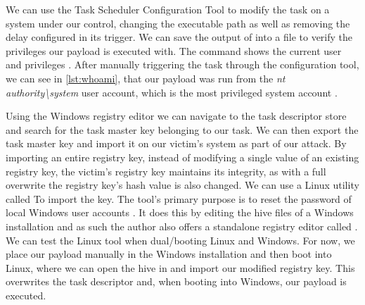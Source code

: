 We can use the Task Scheduler Configuration Tool to modify the  task on a system under our control, changing the executable path as well as removing the delay configured in its trigger.
We can save the output of  into a file to verify the privileges our payload is executed with.
The  command shows the current user and privileges \cite{microsoft-whoami}.
After manually triggering the task through the configuration tool, we can see in \autoref{lst:whoami}, that our payload was run from the \emph{nt authority\textbackslash system} user account, which is the most privileged system account \cite{microsoft-localsystem-account}.

\vspace{1em}



Using the Windows registry editor  we can navigate to the task descriptor store and search for the task master key belonging to our task.
We can then export the task master key and import it on our victim's system as part of our attack.
By importing an entire registry key, instead of modifying a single value of an existing registry key, the victim's registry key maintains its integrity, as with a full overwrite the registry key's hash value is also changed.
We can use a Linux utility called  To import the key.
The tool's primary purpose is to reset the password of local Windows user accounts \cite{chntpw}.
It does this by editing the hive files of a Windows installation and as such the author also offers a standalone registry editor called .
We can test the Linux tool when dual\-/booting Linux and Windows.
For now, we place our payload manually in the Windows installation and then boot into Linux, where we can open the  hive in  and import our modified registry key.
This overwrites the task descriptor and, when booting into Windows, our payload is executed.

